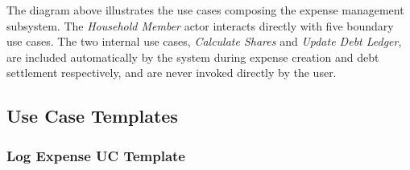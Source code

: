The diagram above illustrates the use cases composing the expense management subsystem. The \textit{Household Member} actor interacts directly with five boundary use cases. The two internal use cases, \textit{Calculate Shares} and \textit{Update Debt Ledger}, are included automatically by the system during expense creation and debt settlement respectively, and are never invoked directly by the user.

\subsection{Use Case Templates}

\subsubsection{Log Expense UC Template}
